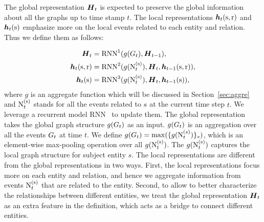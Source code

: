 
The global representation $\boldsymbol{H}_t$ is expected to preserve the global information about all the graphs up to time stamp $t$.
The local representations $\boldsymbol{h}_t(\mathrm{s}, \mathrm{r})$ and $\boldsymbol{h}_t(\mathrm{s})$ emphasize more on the local events related to each entity and relation.
Thus we define them as follows:

\small
\begin{align}
    \boldsymbol{H}_{t} &= \textrm{RNN}^1(g(G_t), \boldsymbol{H}_{t-1}), \label{eq:globalh}\\
	\boldsymbol{h}_{t}(\mathrm{s},\mathrm{r}) &= \textrm{RNN}^2(g(\text{N}^{(\mathrm{s})}_{t}), \boldsymbol{H}_{t}, \boldsymbol{h}_{t-1}(\mathrm{s},\mathrm{r})),\\
	\boldsymbol{h}_{t}(\mathrm{s}) &= \textrm{RNN}^3(g(\text{N}^{(\mathrm{s})}_{t}), \boldsymbol{H}_{t},\boldsymbol{h}_{t-1}(\mathrm{s})),
\end{align}
\normalsize
where $g$ is an aggregate function which will be discussed in Section~\ref{sec:aggre} and $\text{N}^{(\mathrm{s})}_{t}$ stands for all the events related to $\mathrm{s}$ at the current time step $t$.
We leverage a recurrent model $\textrm{RNN}$~\cite{Cho2014LearningPR} to update them.
The global representation takes the global graph structure $g(G_t)$ as an input.
$g(G_t)$ is an aggregation over all the events $G_t$ at time $t$. 
We define {\small$g(G_t) = \max(\{g(\text{N}_t^{(s)})\}_s)$}, which is an element-wise max-pooling operation over all {\small$g(\text{N}^{(\mathrm{s})}_{t})$}. The $g(\text{N}^{(\mathrm{s})}_{t})$ captures the local graph structure for subject entity $s$. 
The local representations are different from the global representations in two ways.
First, the local representations focus more on each entity and relation, and hence we aggregate information from events $\text{N}^{(\mathrm{s})}_{t}$ that are related to the entity. Second, to allow \method to better characterize the relationships between different entities, we treat the global representation $\boldsymbol{H}_{t}$ as an extra feature in the definition, which acts as a bridge to connect different entities.

